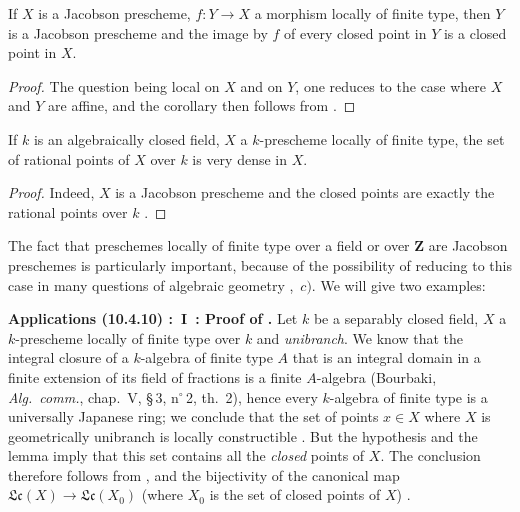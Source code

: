 \begin{corollary}[10.4.7]
\label{IV.10.4.7}
If $X$ is a Jacobson prescheme, $f:Y\to X$ a morphism locally of finite type, then $Y$ is a Jacobson prescheme and the image by $f$ of every closed point in $Y$ is a closed point in $X$.
\end{corollary}

\begin{proof}
The question being local on $X$ and on $Y$, one reduces to the case where $X$ and $Y$ are affine, and the corollary then follows from .
\end{proof}

\begin{corollary}[10.4.8]
\label{IV.10.4.8}
If $k$ is an algebraically closed field, $X$ a $k$-prescheme locally of finite type, the set of rational points of $X$ over $k$ is very dense in $X$.
\end{corollary}

\begin{proof}
Indeed, $X$ is a Jacobson prescheme  and the closed points are exactly the rational points over $k$ .
\end{proof}

\begin{env}[10.4.9]
\label{IV.10.4.9}
The fact that preschemes locally of finite type over a field or over $\mathbf{Z}$ are Jacobson preschemes is particularly important, because of the possibility of reducing to this case in many questions of algebraic geometry ,~$c)$.
We will give two examples:
\end{env}

\begin{env}[10.4.10]
\label{IV.10.4.10}
\textbf{Applications (10.4.10) :~I~: Proof of .}
Let $k$ be a separably closed field, $X$ a $k$-prescheme locally of finite type over $k$ and \emph{unibranch}.
We know that the integral closure of a $k$-algebra of finite type $A$ that is an integral domain in a finite extension of its field of fractions is a finite $A$-algebra (Bourbaki, \emph{Alg.\ comm.}, chap.~V, \S\,3, n$^\circ$\,2, th.~2), hence every $k$-algebra of finite type is a universally Japanese ring; we conclude that the set of points $x\in X$ where $X$ is geometrically unibranch is locally constructible .
But the hypothesis and the lemma  imply that this set contains all the \emph{closed} points of $X$.
The conclusion therefore follows from ,  and the bijectivity of the canonical map $\mathfrak{Lc}(X)\to\mathfrak{Lc}(X_0)$ (where $X_0$ is the set of closed points of $X$) .
\end{env}

